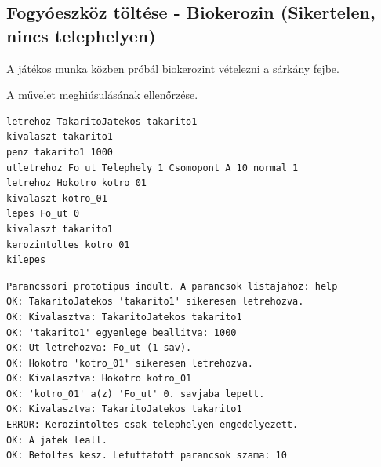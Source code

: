 \subsection{Fogyóeszköz töltése - Biokerozin (Sikertelen, nincs telephelyen)}
\begin{test-case-description}
    A játékos munka közben próbál biokerozint vételezni a sárkány fejbe.
\end{test-case-description}
\begin{test-case-function}
    A művelet meghiúsulásának ellenőrzése.
\end{test-case-function}
\begin{test-case-input}
\begin{verbatim}
letrehoz TakaritoJatekos takarito1
kivalaszt takarito1
penz takarito1 1000
utletrehoz Fo_ut Telephely_1 Csomopont_A 10 normal 1
letrehoz Hokotro kotro_01
kivalaszt kotro_01
lepes Fo_ut 0
kivalaszt takarito1
kerozintoltes kotro_01
kilepes
\end{verbatim}
\end{test-case-input}
\begin{test-case-output}
\begin{verbatim}
Parancssori prototipus indult. A parancsok listajahoz: help
OK: TakaritoJatekos 'takarito1' sikeresen letrehozva.
OK: Kivalasztva: TakaritoJatekos takarito1
OK: 'takarito1' egyenlege beallitva: 1000
OK: Ut letrehozva: Fo_ut (1 sav).
OK: Hokotro 'kotro_01' sikeresen letrehozva.
OK: Kivalasztva: Hokotro kotro_01
OK: 'kotro_01' a(z) 'Fo_ut' 0. savjaba lepett.
OK: Kivalasztva: TakaritoJatekos takarito1
ERROR: Kerozintoltes csak telephelyen engedelyezett.
OK: A jatek leall.
OK: Betoltes kesz. Lefuttatott parancsok szama: 10
\end{verbatim}
\end{test-case-output}


